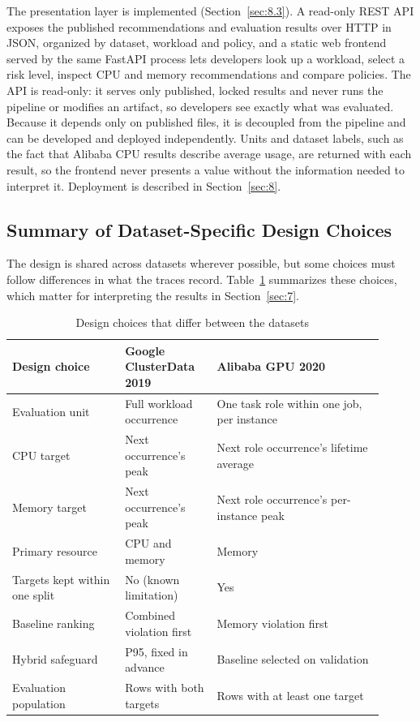 \documentclass{IEEEtran}
\begin{document}
The presentation layer is implemented (Section~\ref{sec:8.3}). A read-only REST API exposes the published recommendations and evaluation results over HTTP in JSON, organized by dataset, workload and policy, and a static web frontend served by the same FastAPI process lets developers look up a workload, select a risk level, inspect CPU and memory recommendations and compare policies. The API is read-only: it serves only published, locked results and never runs the pipeline or modifies an artifact, so developers see exactly what was evaluated. Because it depends only on published files, it is decoupled from the pipeline and can be developed and deployed independently. Units and dataset labels, such as the fact that Alibaba CPU results describe average usage, are returned with each result, so the frontend never presents a value without the information needed to interpret it. Deployment is described in Section~\ref{sec:8}.

\subsection{Summary of Dataset-Specific Design Choices}\label{sec:4.5}

The design is shared across datasets wherever possible, but some choices must follow differences in what the traces record. Table~\ref{tab:4.1} summarizes these choices, which matter for interpreting the results in Section~\ref{sec:7}.

\begin{table}[!t]
\centering
\footnotesize
\caption{Design choices that differ between the datasets}\label{tab:4.1}
\begin{tabular}{>{\raggedright\arraybackslash}p{0.276\linewidth}>{\raggedright\arraybackslash}p{0.225\linewidth}>{\raggedright\arraybackslash}p{0.409\linewidth}}
\hline
\textbf{Design choice} & \textbf{Google ClusterData 2019} & \textbf{Alibaba GPU 2020} \\ \hline
Evaluation unit & Full workload occurrence & One task role within one job, per instance \\
CPU target & Next occurrence's peak & Next role occurrence's lifetime average \\
Memory target & Next occurrence's peak & Next role occurrence's per-instance peak \\
Primary resource & CPU and memory & Memory \\
Targets kept within one split & No (known limitation) & Yes \\
Baseline ranking & Combined violation first & Memory violation first \\
Hybrid safeguard & P95, fixed in advance & Baseline selected on validation \\
Evaluation population & Rows with both targets & Rows with at least one target \\
\hline
\end{tabular}
\end{table}
\end{document}
